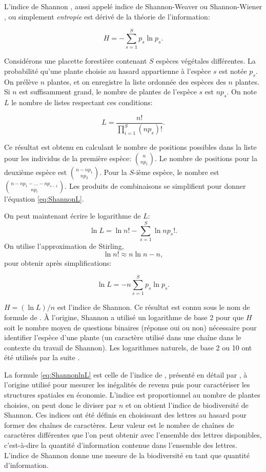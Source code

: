 \documentclass[
  11pt,
  french,
  a4paper,
  extrafontsizes,onecolumn,openright
  ]{memoir}
\begin{document}
L'indice de Shannon \autocite{Shannon1948,Shannon1963}, aussi appelé indice de Shannon-Weaver ou Shannon-Wiener \autocite{Spellerberg2003}, ou simplement \emph{entropie} est dérivé de la théorie de l'information:

\begin{equation}
  \label{eq:Shannon}
  H = -\sum^S_{s=1}{p_s\ln{p_s}}.
\end{equation}

Considérons une placette forestière contenant \(S\) espèces végétales différentes.
La probabilité qu'une plante choisie au hasard appartienne à l'espèce \(s\) est notée \(p_s\).
On prélève \(n\) plantes, et on enregistre la liste ordonnée des espèces des \(n\) plantes.
Si \(n\) est suffisamment grand, le nombre de plantes de l'espèce \(s\) est \(np_s\).
On note \(L\) le nombre de listes respectant ces conditions:

\begin{equation}
  \label{eq:ShannonL}
  L = \frac{n!}{\prod^S_{i=1}{\left({np}_s\right)!}}.
\end{equation}

Ce résultat est obtenu en calculant le nombre de positions possibles dans la liste pour les individus de la première espèce: \(\binom{n}{np_1}\).
Le nombre de positions pour la deuxième espèce est \(\binom{n-np_1}{np_2}\).
Pour la \(S\)-ième espèce, le nombre est \(\binom{n-np_1-\dots -np_{s-1}}{np_i}\).
Les produits de combinaisons se simplifient pour donner l'équation \eqref{eq:ShannonL}.

On peut maintenant écrire le logarithme de \(L\):
\[\ln{L}=\ln{n!}-\sum^S_{s=1}{\ln{np_s}!}.\]
On utilise l'approximation de Stirling,
\[\ln{n!}\approx n\ln{n}-n,\]
pour obtenir après simplifications:

\begin{equation}
  \label{eq:ShannonlnL}
  \ln{L} = -n\sum^S_{s=1}{p_s \ln{p_s}}.
\end{equation}

\(H=(\ln{L})/{n}\) est l'indice de Shannon.
Ce résultat est connu sous le nom de formule de \textcite{Brillouin1962}.
À l'origine, Shannon a utilisé un logarithme de base 2 pour que \(H\) soit le nombre moyen de questions binaires (réponse oui ou non) nécessaire pour identifier l'espèce d'une plante (un caractère utilisé dans une chaîne dans le contexte du travail de Shannon).
Les logarithmes naturels, de base 2 ou 10 ont été utilisés par la suite \autocite{Pielou1966a}.

La formule \eqref{eq:ShannonlnL} est celle de l'indice de \textcite{Theil1967}, présenté en détail par \textcite{Conceicao2000}, à l'origine utilisé pour mesurer les inégalités de revenu puis pour caractériser les structures spatiales en économie.
L'indice est proportionnel au nombre de plantes choisies, on peut donc le diviser par \(n\) et on obtient l'indice de biodiversité de Shannon.
Ces indices ont été définis en choisissant des lettres au hasard pour former des chaînes de caractères.
Leur valeur est le nombre de chaînes de caractères différentes que l'on peut obtenir avec l'ensemble des lettres disponibles, c'est-à-dire la quantité d'information contenue dans l'ensemble des lettres.
L'indice de Shannon donne une mesure de la biodiversité en tant que quantité d'information.
\end{document}
